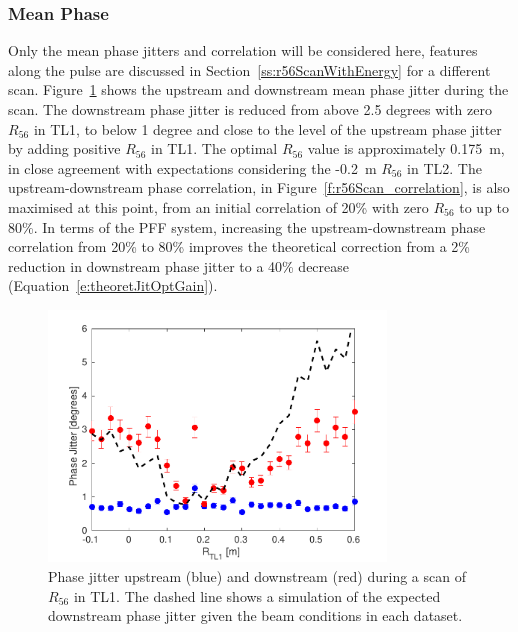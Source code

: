 \subsubsection{Mean Phase}

Only the mean phase jitters and correlation will be considered here, features along the pulse are discussed in Section~\ref{ss:r56ScanWithEnergy} for a different scan. Figure~\ref{f:r56Scan_meanPhaseJit} shows the upstream and downstream mean phase jitter during the scan. The downstream phase jitter is reduced from above 2.5 degrees with zero \(R_{56}\) in TL1, to below 1 degree and close to the level of the upstream phase jitter by adding positive \(R_{56}\) in TL1. The optimal \(R_{56}\) value is approximately 0.175~m, in close agreement with expectations considering the -0.2~m \(R_{56}\) in TL2. The upstream-downstream phase correlation, in Figure~\ref{f:r56Scan_correlation}, is also maximised at this point, from an initial correlation of 20\% with zero \(R_{56}\) to up to 80\%. In terms of the PFF system, increasing the upstream-downstream phase correlation from 20\% to 80\% improves the theoretical correction from a 2\% reduction in downstream phase jitter to a 40\% decrease (Equation~\ref{e:theoretJitOptGain}).

\begin{figure}
  \centering
  \includegraphics[width=0.8\textwidth]{Figures/propagation/r56Scan_meanPhaseJit}
  \caption{Phase jitter upstream (blue) and downstream (red) during a scan of \(R_{56}\) in TL1. The dashed line shows a simulation of the expected downstream phase jitter given the beam conditions in each dataset.}
  \label{f:r56Scan_meanPhaseJit}
\end{figure}

